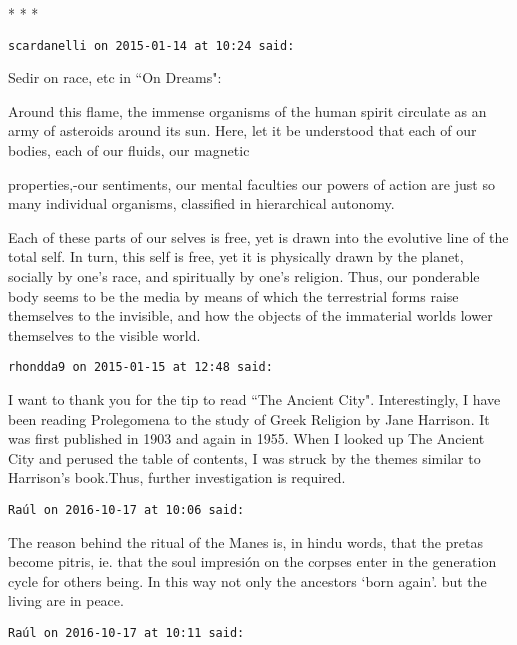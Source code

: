 
\begin{center}* * *\end{center}

\begin{footnotesize}\begin{sffamily}



\texttt{scardanelli on 2015-01-14 at 10:24 said: }

Sedir on race, etc in ``On Dreams":

Around this flame, the immense organisms of the human spirit circulate as an army of asteroids around its sun. Here, let it be understood that each of our bodies, each of our fluids, our magnetic

properties,-our sentiments, our mental faculties our powers of action are just so many individual organisms, classified in hierarchical autonomy.

Each of these parts of our selves is free, yet is drawn into the evolutive line of the total self. In turn, this self is free, yet it is physically drawn by the planet, socially by one's race, and spiritually by one's religion. Thus, our ponderable body seems to be the media by means of which the terrestrial forms raise themselves to the invisible, and how the objects of the immaterial worlds lower themselves to the visible world.


\hfill

\texttt{rhondda9 on 2015-01-15 at 12:48 said: }

I want to thank you for the tip to read ``The Ancient City". Interestingly, I have been reading Prolegomena to the study of Greek Religion by Jane Harrison. It was first published in 1903 and again in 1955. When I looked up The Ancient City and perused the table of contents, I was struck by the themes similar to Harrison's book.Thus, further investigation is required.


\hfill

\texttt{Raúl on 2016-10-17 at 10:06 said: }

The reason behind the ritual of the Manes is, in hindu words, that the pretas become pitris, ie. that the soul impresión on the corpses enter in the generation cycle for others being. In this way not only the ancestors `born again'. but the living are in peace.


\hfill

\texttt{Raúl on 2016-10-17 at 10:11 said: }


\end{sffamily}
\end{footnotesize}
